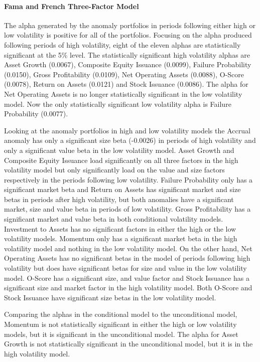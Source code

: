 \documentclass[12pt, a4paper, oneside]{article}
\begin{document}
\paragraph{Fama and French Three-Factor Model}
The alpha generated by the anomaly portfolios in periods following either high or low volatility is positive for all of the portfolios. Focusing on the alpha produced following periods of high volatility, eight of the eleven alphas are statistically significant at the 5\% level. The statistically significant high volatility alphas are Asset Growth (0.0067), Composite Equity Issuance (0.0099), Failure Probability (0.0150), Gross Profitability (0.0109), Net Operating Assets (0.0088), O-Score (0.0078), Return on Assets (0.0121) and Stock Issuance (0.0086). The alpha for Net Operating Assets is no longer statistically significant in the low volatility model. Now the only statistically significant low volatility alpha is Failure Probability (0.0077). 

Looking at the anomaly portfolios in high and low volatility models the Accrual anomaly has only a significant size beta (-0.0026) in periods of high volatility and only a significant value beta in the low volatility model. Asset Growth and Composite Equity Issuance load significantly on all three factors in the high volatility model but only significantly load on the value and size factors respectively in the periods following low volatility. Failure Probability only has a significant market beta and Return on Assets has significant market and size betas in periods after high volatility, but both anomalies have a significant market, size and value beta in periods of low volatility. Gross Profitability has a significant market and value beta in both conditional volatility models. Investment to Assets has no significant factors in either the high or the low volatility models. Momentum only has a significant market beta in the high volatility model and nothing in the low volatility model. On the other hand, Net Operating Assets has no significant betas in the model of periods following high volatility but does have significant betas for size and value in the low volatility model. O-Score has a significant size, and value factor and Stock Issuance has a significant size and market factor in the high volatility model. Both O-Score and Stock Issuance have significant size betas in the low volatility model.

Comparing the alphas in the conditional model to the unconditional model, Momentum is not statistically significant in either the high or low volatility models, but it is significant in the unconditional model. The alpha for Asset Growth is not statistically significant in the unconditional model, but it is in the high volatility model.
\end{document}
